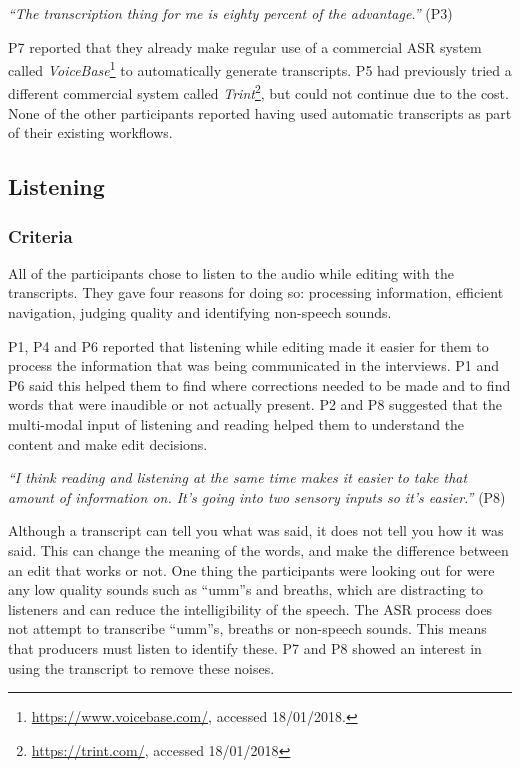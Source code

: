 \textit{``The transcription thing for me is eighty percent of the advantage.''} (P3)

P7 reported that they already make regular use of a commercial ASR system called
\textit{VoiceBase}\footnote{\url{https://www.voicebase.com/}, accessed 18/01/2018.} to automatically generate
transcripts.  P5 had previously tried a different commercial system called
\textit{Trint}\footnote{\url{https://trint.com/}, accessed 18/01/2018}, but could not continue due to the cost. None of
the other participants reported having used automatic transcripts as part of their existing workflows.





\subsection{Listening}

\subsubsection{Criteria}

All of the participants chose to listen to the audio while editing with the transcripts. They gave four reasons for
doing so: processing information, efficient navigation, judging quality and identifying non-speech sounds.

P1, P4 and P6 reported that listening while editing made it easier for them to process the information that was being
communicated in the interviews.  P1 and P6 said this helped them to find where corrections needed to be made and to find
words that were inaudible or not actually present.  P2 and P8 suggested that the multi-modal input of listening and
reading helped them to understand the content and make edit decisions.

\textit{``I think reading and listening at the same time makes it easier to take that amount of information on. It's
going into two sensory inputs so it's easier.''} (P8)





Although a transcript can tell you what was said, it does not tell you how it was said. This can change the meaning of
the words, and make the difference between an edit that works or not.
One thing the participants were looking out for were any low quality sounds such as ``umm''s and breaths, which are
distracting to listeners and can reduce the intelligibility of the speech.
The ASR process does not attempt to
transcribe ``umm''s, breaths or non-speech sounds. This means that producers must listen to identify these.
P7 and P8 showed an interest in using the transcript to remove these noises.


